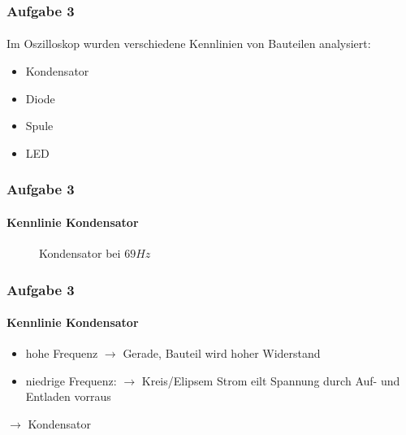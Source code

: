 \begin{frame}
\frametitle{Aufgabe 3}
\framesubtitle{}
Im Oszilloskop wurden verschiedene Kennlinien von Bauteilen analysiert:
\begin{itemize}
    \item Kondensator
    \item Diode
    \item Spule
    \item LED
\end{itemize}
\end{frame}
\begin{frame}
\frametitle{Aufgabe 3}
\framesubtitle{Kennlinie Kondensator}
    \begin{figure}[H]
    \caption{Kondensator bei $69Hz$}
    \begin{center}
    \end{center}
    \end{figure}
\end{frame}
\begin{frame}
\frametitle{Aufgabe 3}
\framesubtitle{Kennlinie Kondensator}
\begin{itemize}
    \item hohe Frequenz $\rightarrow$ Gerade, Bauteil wird hoher Widerstand
    \item niedrige Frequenz: $\rightarrow$ Kreis/Elipsem Strom eilt Spannung durch Auf- und Entladen vorraus 
\end{itemize}
$\rightarrow$ Kondensator
\end{frame}
